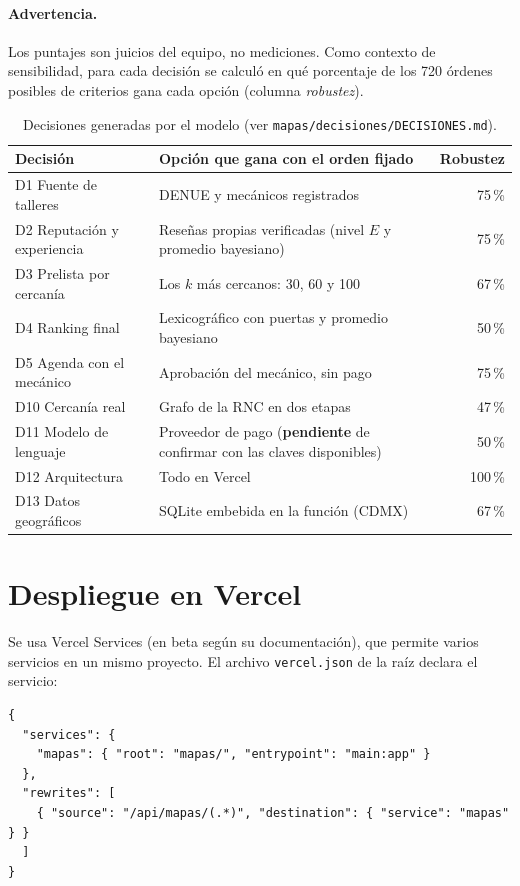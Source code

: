 \documentclass[11pt,a4paper]{article}
\newcommand{\code}[1]{\texttt{#1}}
\begin{document}
\paragraph{Advertencia.} Los puntajes son juicios del equipo, no mediciones. Como contexto de
sensibilidad, para cada decisión se calculó en qué porcentaje de los 720 órdenes posibles de
criterios gana cada opción (columna \emph{robustez}).

\begin{table}[h]
\centering
\begin{tabularx}{\textwidth}{@{}l Y r@{}}
\toprule
Decisión & Opción que gana con el orden fijado & Robustez \\
\midrule
D1 Fuente de talleres & DENUE y mecánicos registrados & 75\,\% \\
D2 Reputación y experiencia & Reseñas propias verificadas (nivel $E$ y promedio bayesiano) & 75\,\% \\
D3 Prelista por cercanía & Los $k$ más cercanos: 30, 60 y 100 & 67\,\% \\
D4 Ranking final & Lexicográfico con puertas y promedio bayesiano & 50\,\% \\
D5 Agenda con el mecánico & Aprobación del mecánico, sin pago & 75\,\% \\
D10 Cercanía real & Grafo de la RNC en dos etapas & 47\,\% \\
D11 Modelo de lenguaje & Proveedor de pago (\textbf{pendiente} de confirmar con las claves disponibles) & 50\,\% \\
D12 Arquitectura & Todo en Vercel & 100\,\% \\
D13 Datos geográficos & SQLite embebida en la función (CDMX) & 67\,\% \\
\bottomrule
\end{tabularx}
\caption{Decisiones generadas por el modelo (ver \code{mapas/decisiones/DECISIONES.md}).}
\end{table}

\section{Despliegue en Vercel}

Se usa Vercel Services (en beta según su documentación), que permite varios servicios en un mismo
proyecto. El archivo \code{vercel.json} de la raíz declara el servicio:

\begin{lstlisting}
{
  "services": {
    "mapas": { "root": "mapas/", "entrypoint": "main:app" }
  },
  "rewrites": [
    { "source": "/api/mapas/(.*)", "destination": { "service": "mapas" } }
  ]
}
\end{lstlisting}
\end{document}
